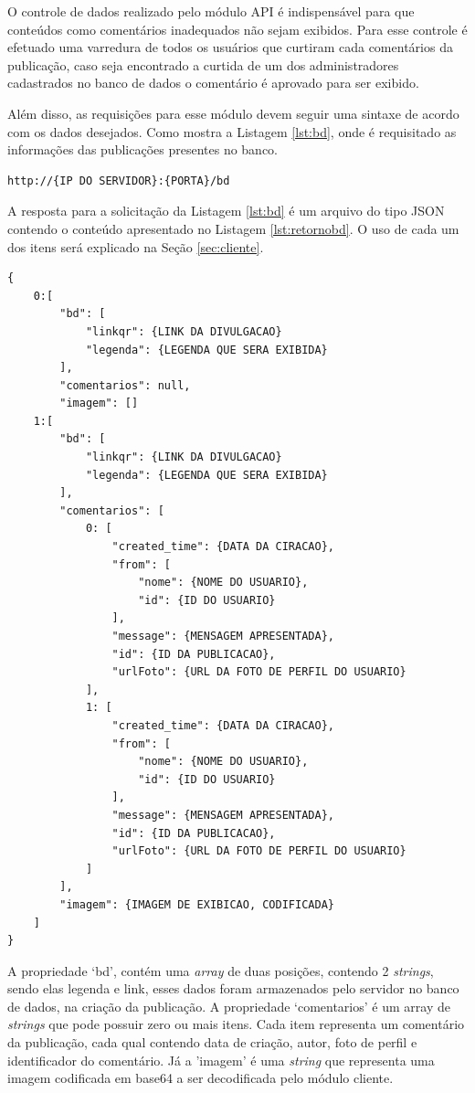 O controle de dados realizado pelo módulo API é indispensável para que conteúdos como comentários inadequados não sejam exibidos. Para esse controle é efetuado uma varredura de todos os usuários que curtiram cada comentários da publicação, caso seja encontrado a curtida de um dos administradores cadastrados no banco de dados o comentário é aprovado para ser exibido.

Além disso, as requisições para esse módulo devem seguir uma sintaxe de acordo com os dados desejados. Como mostra a Listagem \ref{lst:bd}, onde é requisitado as informações das publicações presentes no banco.

\begin{lstlisting}[caption={Requisitando dados para divulgação},label={lst:bd}]
	http://{IP DO SERVIDOR}:{PORTA}/bd
\end{lstlisting}

A resposta para a solicitação da Listagem \ref{lst:bd} é um arquivo do tipo JSON contendo o conteúdo apresentado no Listagem \ref{lst:retornobd}. O uso de cada um dos itens será explicado na Seção \ref{sec:cliente}.

\begin{lstlisting}[caption={Retorno da requisição \ref{lst:bd}},label={lst:retornobd}]
{
	0:[
		"bd": [
			"linkqr": {LINK DA DIVULGACAO}
			"legenda": {LEGENDA QUE SERA EXIBIDA}		
		],
		"comentarios": null,
		"imagem": []
	1:[
		"bd": [
			"linkqr": {LINK DA DIVULGACAO}
			"legenda": {LEGENDA QUE SERA EXIBIDA}
		],
		"comentarios": [
			0: [
				"created_time": {DATA DA CIRACAO},
				"from": [
					"nome": {NOME DO USUARIO},
					"id": {ID DO USUARIO}
				],
				"message": {MENSAGEM APRESENTADA},
				"id": {ID DA PUBLICACAO},
				"urlFoto": {URL DA FOTO DE PERFIL DO USUARIO}
			],
			1: [
				"created_time": {DATA DA CIRACAO},
				"from": [
					"nome": {NOME DO USUARIO},
					"id": {ID DO USUARIO}
				],
				"message": {MENSAGEM APRESENTADA},
				"id": {ID DA PUBLICACAO},
				"urlFoto": {URL DA FOTO DE PERFIL DO USUARIO}
			]
		],
		"imagem": {IMAGEM DE EXIBICAO, CODIFICADA}
	]
}
\end{lstlisting}

A propriedade `bd', contém uma \textit{array} de duas posições, contendo 2 \textit{strings}, sendo elas legenda e link, esses dados foram armazenados pelo servidor no banco de dados, na criação da publicação. A propriedade `comentarios' é um array de \textit{strings} que pode possuir zero ou mais itens. Cada item representa um comentário da publicação, cada qual contendo data de criação, autor, foto de perfil e identificador do comentário. Já a 'imagem' é uma \textit{string} que representa uma imagem codificada em base64 a ser decodificada pelo módulo cliente.

